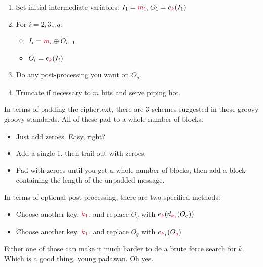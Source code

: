     \begin{enumerate}
        \item Set initial intermediate variables: $I_{1} = \csubm{1}, O_{1} = e_{\ck}(I_{1})$
        \item For $i = 2, 3 ... q$:
            \begin{itemize}
                \item $I_{i} = \csubm{i} \oplus O_{i - 1}$
                \item $O_{i} = e_{\ck}(I_{i})$
            \end{itemize}
        \item Do any post-processing you want on $O_{q}$.
        \item Truncate if necessary to $m$ bits and serve piping hot.
    \end{enumerate}
    In terms of padding the ciphertext, there are 3 schemes suggested in those groovy groovy standards. All of these pad to a whole number of blocks.
    \begin{itemize}
        \item Just add zeroes. Easy, right?
        \item Add a single 1, then trail out with zeroes.
        \item Pad with zeroes until you get a whole number of blocks, then add a block containing the length of the unpadded message.
    \end{itemize}
    In terms of optional post-processing, there are two specified methods:
    \begin{itemize}
        \item Choose another key, $\csubk{1}$, and replace $O_{q}$ with $e_{\ck}(d_{\csubk{1}}(O_{q}))$
        \item Choose another key, $\csubk{1}$, and replace $O_{q}$ with $e_{\ck_{1}}(O_{\cq})$ 
    \end{itemize}
    Either one of those can make it much harder to do a brute force search for $k$. Which is a good thing, young padawan. Oh yes.

